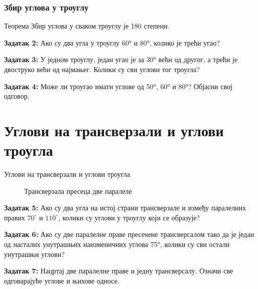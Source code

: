 \documentclass[11pt]{beamer}
\begin{document}
\begin{frame}\frametitle{Збир углова у троуглу}

\begin{block}{Теорема}
Збир углова у сваком троуглу је 180 степени.
\end{block}

\textbf{Задатак 2:}
Ако су два угла у троуглу 60° и 80°, колико је трећи угао?


\textbf{Задатак 3:}
У једном троуглу, један угао је за 30° већи од другог, а трећи је двоструко већи од најмањег. Колики су сви углови тог троугла?

\textbf{Задатак 4:}
Може ли троугао имати углове од 50°, 60° и 80°? Објасни свој одговор.

\end{frame}


\section{Углови на трансверзали и углови троугла}
\begin{frame}{Углови на трансверзали и углови троугла}

\begin{figure}[!ht]
\centering
{}%
\caption{Трансверзала пресеца две паралеле}
\label{transverzala}
\end{figure}

\textbf{Задатак 5:}
Ако су два угла на истој страни трансверзале и између паралелних правих $70^\circ$ и $110^\circ$, колики су углови у троуглу који се образује?

\textbf{Задатак 6:}
Ако су две паралелне праве пресечене трансверсалом тако да је један од насталих унутрашњих наизменичних углова 75°, колики су сви остали унутрашњи углови?

\textbf{Задатак 7:}
Нацртај две паралелне праве и једну трансверсалу. Означи све одговарајуће углове и њихове односе.

\end{frame}
\end{document}
